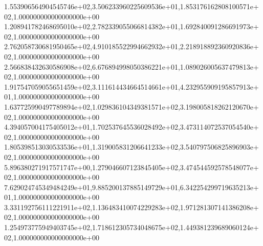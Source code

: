 1.553906564904545746e+02,3.506233960225609536e+01,1.853176162808100571e+02,1.000000000000000000e+00
1.208941782468695010e+02,2.782339055066814382e+01,1.692840091286691973e+02,1.000000000000000000e+00
2.762058730681950465e+02,4.910185522994662932e+01,2.218918892360920836e+02,1.000000000000000000e+00
2.566838432630586908e+02,6.676894998050386221e+01,1.089026005637479813e+02,1.000000000000000000e+00
1.917547059055651459e+02,3.111614434664514661e+01,4.232955909195857913e+01,1.000000000000000000e+00
1.637725990497789894e+02,1.029836104349381571e+02,3.198005818262120670e+02,1.000000000000000000e+00
4.394057004175405012e+01,1.702537645536028492e+02,3.473114072537054540e+02,1.000000000000000000e+00
1.805398513030533536e+01,1.319005831206641233e+02,3.540797506825896903e+02,1.000000000000000000e+00
5.896380271917571747e+00,1.279046607123845405e+02,3.474544592578548077e+02,1.000000000000000000e+00
7.629024745349484249e+01,9.885200137885149729e+01,6.342254299719635213e+01,1.000000000000000000e+00
3.331192756111221911e+02,1.136483410074229283e+02,1.971281307141386208e+02,1.000000000000000000e+00
1.254973775949403745e+02,1.718612305734048675e+02,1.449381239689060124e+02,1.000000000000000000e+00

